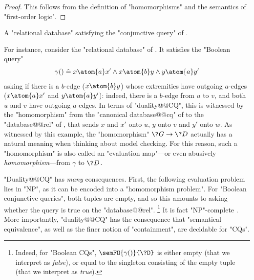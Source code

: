 \begin{proof}
	This follows from the definition of "homomorphisms" and
	the semantics of "first-order logic".
\end{proof}
\begin{marginfigure}
	\centering
	\caption{\AP\label{fig:prelim-db-stupid-ex}
		A "relational database" satisfying the "conjunctive query" of 
		.
	}
\end{marginfigure}
For instance, consider the "relational database" of .
It satisfies the "Boolean query" 
\[
	\gamma() \defeq x \atom{a} x' \land x \atom{b} y \land y \atom{a} y'
\]
asking if there is a $b$-edge ($x \atom{b} y$) whose extremities
have outgoing $a$-edges ($x \atom{a} x'$ and $y \atom{a} y'$):
indeed, there is a $b$-edge from $u$ to $v$, and both $u$ and $v$
have outgoing $a$-edges. In terms of "duality@@CQ", this is
witnessed by the "homomorphism" from the
"canonical database@@cq" of  to the
"database@@rel" of ,
that sends $x$ and $x'$ onto $u$, $y$ onto $v$ and $y'$ onto $w$.
As witnessed by this example, the "homomorphism" $\?G \to \?D$ actually has a
natural meaning when thinking about model checking.
For this reason, such a "homomorphism" is also called an "evaluation map"---or even
abusively \emph{homomorphism}---from $\gamma$ to $\?D$.

"Duality@@CQ" has \emph{many} consequences. First, the following evaluation problem
lies in "NP", as it can be encoded into a "homomorphism problem".
For "Boolean conjunctive queries", both tuples are empty, and so
this amounts to asking whether the query is true on the "database@@rel".%
\footnote{Indeed, for "Boolean CQs",
$\semFO{\gamma()}{\?D}$ is either empty (that we interpret as \emph{false}),
or equal to the singleton consisting of the empty tuple (that we interpret as \emph{true}).}
It is fact "NP"-complete \cite[Theorem 7]{ChandraMerlin1977Implementation}.
More importantly, "duality@@CQ" has the consequence that
"semantical equivalence", as well as the finer notion of "containment",
are decidable for "CQs".

